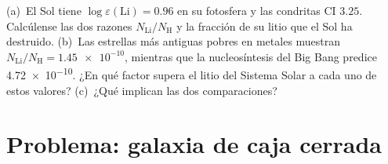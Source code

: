 \begin{exercise}[$\star\star\star$]\label{exo:b3:origin-of-elements:12}
(a)~El Sol tiene $\log\varepsilon(\mathrm{Li}) = 0.96$ en su fotosfera
y las condritas CI $3.25$. Calcúlense las dos razones $N_\mathrm{Li}/N_\mathrm{H}$
y la fracción de su litio que el Sol ha destruido. (b)~Las estrellas más antiguas
pobres en metales muestran $N_\mathrm{Li}/N_\mathrm{H} = \num{1.45e-10}$,
mientras que la nucleosíntesis del Big Bang predice \num{4.72e-10}. ¿En qué factor
supera el litio del Sistema Solar a cada uno de estos valores? (c)~¿Qué implican las dos
comparaciones?
\end{exercise}

\section{Problema: galaxia de caja cerrada}

